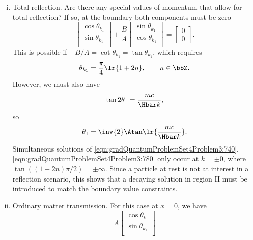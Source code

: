 \begin{enumerate}[(i)]
\item Total reflection.  Are there any special values of momentum that allow for total reflection?  If so, at the boundary both components must be zero
%
\begin{equation}\label{eqn:gradQuantumProblemSet4Problem3:720}
\begin{bmatrix}
\cos\theta_{k_1} \\
\sin\theta_{k_1} \\
\end{bmatrix}
+
\frac{B}{A}
\begin{bmatrix}
\sin\theta_{k_1} \\
\cos\theta_{k_1} \\
\end{bmatrix}
=
\begin{bmatrix}
0 \\
0
\end{bmatrix}.
\end{equation}
This is possible if \( -B/A = \cot\theta_{k_1} = \tan\theta_{k_1} \), which requires
%
\begin{equation}\label{eqn:gradQuantumProblemSet4Problem3:740}
\theta_{k_1} = \frac{\pi}{4} \lr{ 1 + 2 n }, \qquad n \in \bbZ.
\end{equation}
%
However, we must also have
%
\begin{equation}\label{eqn:gradQuantumProblemSet4Problem3:760}
\tan 2 \theta_1 = \frac{m c}{\Hbar k},
\end{equation}
%
so
%
\begin{equation}\label{eqn:gradQuantumProblemSet4Problem3:780}
\theta_1 = \inv{2} \Atan\lr{ \frac{m c}{\Hbar k} }.
\end{equation}
%
Simultaneous solutions of \cref{eqn:gradQuantumProblemSet4Problem3:740}, \cref{eqn:gradQuantumProblemSet4Problem3:780} only occur at \( k = \pm 0 \), where \( \tan( (1 + 2 n)\pi/2 ) = \pm \infty \).  Since a particle at rest is not at interest in a reflection scenario, this shows that a decaying solution in region II must be introduced to match the boundary value constraints.
\item Ordinary matter transmission.
For this case at \( x = 0 \), we have
%
\begin{equation}\label{eqn:gradQuantumProblemSet4Problem3:920}
A
\begin{bmatrix}
\cos\theta_{k_1} \\
\sin\theta_{k_1} \\
\end{bmatrix}

\end{equation}
\end{enumerate}
